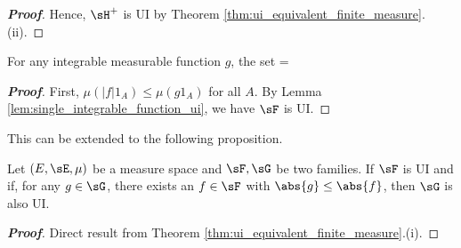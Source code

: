 \begin{proof}[\bf Proof]

Hence, $\sH^+$ is UI by Theorem \ref{thm:ui_equivalent_finite_measure}.(ii).
\end{proof}

\begin{proposition}\label{pro:dominated_integrable_implies_ui}
For any integrable measurable function $g$, the set \be \sF = \quad{} \ee
\end{proposition}

\begin{proof}[\bf Proof]
First, $\mu(|f|1_A) \leq \mu(g 1_A)$ for all $A$. By Lemma \ref{lem:single_integrable_function_ui}, we have $\sF$ is UI.
\end{proof}

This can be extended to the following proposition.

\begin{proposition}
Let $(E,\sE,\mu)$ be a measure space and $\sF,\sG$ be two families. If $\sF$ is UI and if, for any $g\in \sG$, there exists an $f\in \sF$ with $\abs{g}\leq \abs{f}$, then $\sG$ is also UI.
\end{proposition}

\begin{proof}[\bf Proof]
Direct result from Theorem \ref{thm:ui_equivalent_finite_measure}.(i).
\end{proof}



